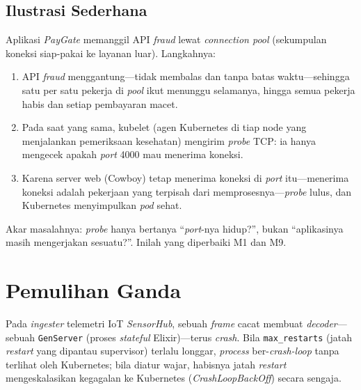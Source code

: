 \subsection{Ilustrasi Sederhana}
\label{subsec:p1-ilustrasi}
Aplikasi \emph{PayGate} memanggil API \emph{fraud} lewat \emph{connection pool} (sekumpulan
koneksi siap-pakai ke layanan luar). Langkahnya:
\begin{enumerate}[nosep,leftmargin=2em]
  \item API \emph{fraud} menggantung---tidak membalas dan tanpa batas waktu---sehingga satu
        per satu pekerja di \emph{pool} ikut menunggu selamanya, hingga semua pekerja habis
        dan setiap pembayaran macet.
  \item Pada saat yang sama, kubelet (agen Kubernetes di tiap node yang menjalankan
        pemeriksaan kesehatan) mengirim \emph{probe} TCP: ia hanya mengecek apakah \emph{port}
        4000 mau menerima koneksi.
  \item Karena server web (Cowboy) tetap menerima koneksi di \emph{port} itu---menerima
        koneksi adalah pekerjaan yang terpisah dari memprosesnya---\emph{probe} lulus, dan
        Kubernetes menyimpulkan \emph{pod} sehat.
\end{enumerate}
\noindent Akar masalahnya: \emph{probe} hanya bertanya ``\emph{port}-nya hidup?'', bukan
``aplikasinya masih mengerjakan sesuatu?''. Inilah yang diperbaiki M1 dan M9.

\section{Pemulihan Ganda}
\label{sec:p2}
Pada \emph{ingester} telemetri IoT \emph{SensorHub}, sebuah \emph{frame} cacat membuat
\emph{decoder}---sebuah \texttt{GenServer} (proses \emph{stateful} Elixir)---terus
\emph{crash}. Bila \texttt{max\_restarts} (jatah \emph{restart} yang dipantau supervisor)
terlalu longgar,
\emph{process} ber-\emph{crash-loop} tanpa terlihat oleh Kubernetes; bila diatur wajar,
habisnya jatah \emph{restart} mengeskalasikan kegagalan ke Kubernetes (\emph{CrashLoopBackOff})
secara sengaja.

